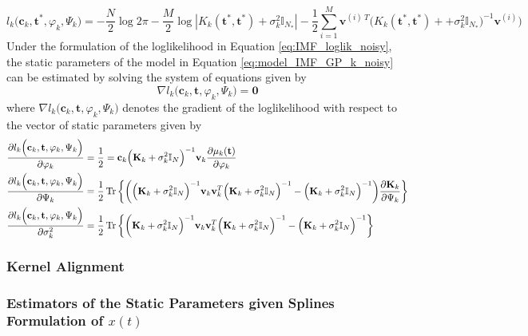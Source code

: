 \begin{equation}
l_k\Big( \mathbf{c}_k, \mathbf{t}^* , \varphi_k, \Psi_k \Big) = - \frac{N}{2} \log 2 \pi - \frac{M}{2} \log |K_k (\mathbf{t}^*,\mathbf{t}^*  ) + \sigma^2_k \mathbb{I}_{N_*} | - \frac{1}{2}\sum_{i = 1}^M \mathbf{v}^{(i) \ T} \Big( K_k (\mathbf{t}^*,\mathbf{t}^*  ) +  + \sigma^2_k \mathbb{I}_{N_*} \Big)^{-1}\mathbf{v}^{(i)} \big) 
\end{equation}
Under the formulation of the loglikelihood in Equation \eqref{eq:IMF_loglik_noisy}, the static parameters of the model in Equation \eqref{eq:model_IMF_GP_k_noisy} can be estimated by solving the system of equations given by
\begin{equation}
\nabla l_k\Big( \mathbf{c}_k, \mathbf{t} , \varphi_k, \Psi_k \Big)  = \mathbf{0}
\end{equation}
where $\nabla l_k\Big( \mathbf{c}_k, \mathbf{t} , \varphi_k, \Psi_k \Big) $ denotes the gradient of the loglikelihood with respect to the vector of static parameters given by
\begin{align*}
& \frac{\partial l_k\Big( \mathbf{c}_k, \mathbf{t} , \varphi_k, \Psi_k \Big)}{\partial \varphi_k} = \frac{1}{2} = \mathbf{c}_k \Big(\mathbf{K}_k + \sigma^2_k \mathbb{I}_N\Big)^{-1} \mathbf{v}_k \frac{\partial \mu_k(\mathbf{t})}{\partial \varphi_k} \\
& \frac{\partial l_k\Big( \mathbf{c}_k, \mathbf{t} , \varphi_k, \Psi_k \Big)}{\partial \Psi_k} = \frac{1}{2} \operatorname*{\text{Tr}} \bigg\{\bigg(\Big(\mathbf{K}_k + \sigma^2_k \mathbb{I}_N\Big)^{-1}  \mathbf{v}_k \mathbf{v}_k^T\Big(\mathbf{K}_k + \sigma^2_k \mathbb{I}_N\Big)^{-1} -\Big(\mathbf{K}_k + \sigma^2_k \mathbb{I}_N\Big)^{-1}  \bigg) \frac{\partial \mathbf{K}_k }{ \partial \Psi_k} \bigg\} \\
& \frac{\partial l_k\Big( \mathbf{c}_k , \mathbf{t} , \varphi_k, \Psi_k \Big)}{\partial \sigma^2_k} = \frac{1}{2} \operatorname*{\text{Tr}} \bigg\{\bigg(\mathbf{K}_k + \sigma^2_k \mathbb{I}_N\Big)^{-1}  \mathbf{v}_k \mathbf{v}_k^T\Big(\mathbf{K}_k + \sigma^2_k \mathbb{I}_N\Big)^{-1} -\Big(\mathbf{K}_k + \sigma^2_k \mathbb{I}_N\Big)^{-1}  \bigg\} \\
\end{align*}

\subsubsection{Kernel Alignment}


\subsubsection{Estimators of the Static Parameters given Splines Formulation of $x(t)$}